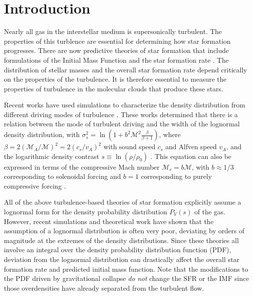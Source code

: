

\ifstandalone

\fi

\section{Introduction}
Nearly all gas in the interstellar medium is supersonically turbulent.  The
properties of this turblence are essential for determining how star formation
progresses.
There are now predictive theories of star formation that include formulations
of the Initial Mass Function \citep[IMF;][]{Padoan2002a, Padoan2007a, Chabrier2010a, 
Elmegreen2011a, Hopkins2012b, Hennebelle2013a} and the star
formation rate
\citep[SFR;][]{Krumholz2005c,  Hennebelle2011a,
Padoan2011b, Krumholz2012b, Federrath2012a, Padoan2012a}.
The distribution of stellar masses and the overall star formation rate depend
critically on the properties of the turbulence.  It is therefore essential to
measure the properties of turbulence in the molecular clouds that produce these
stars.

Recent works have used simulations to characterize the density distribution
from different driving modes of turbulence
\citep{Federrath2008a,Federrath2009a,Federrath2010a,Federrath2011a,Price2011b,Federrath2013a}.
These works determined that there is a relation between the mode of turbulent driving and the width
of the lognormal density distribution, with $\sigma_{s}^2 = \ln\left(1+b^2
\mathcal{M}^2 \frac{\beta}{\beta+1}\right)$, where $\beta=2 (\mathcal{M}_A /
\mathcal{M})^2 = 2 (c_s/v_A)^2$ with sound speed $c_s$ and Alfven speed $v_A$,
and the logarithmic density contrast $s\equiv\ln(\rho/\rho_0)$
\citep{Padoan2011b,Molina2012a}.
This equation can also be expressed in terms of the compressive Mach number
$\mathcal{M}_c = b \mathcal{M}$, with $b\approx 1/3$ corresponding to
solenoidal forcing and $b = 1$ corresponding to purely compressive forcing
\citep{Federrath2010a,Konstandin2012a}.

All of the above turbulence-based theories of star formation explicitly assume a
lognormal form for the density probability distribution $P_V(s)$ of the gas.
However, recent simulations \citep{Federrath2013a} and theoretical work
\citep{Hopkins2013a} have shown that the assumption of a
lognormal distribution is often very poor, deviating by orders of magnitude
at the extremes of the density distributions.  Since these theories all involve
an integral over the density probability distribution function (PDF), deviation from
the lognormal distribution can drastically affect the overall star formation
rate and predicted initial mass function.  Note that the modifications to the
PDF driven by gravitational collapse \emph{do not} change the SFR or the IMF
since those overdensities have already separated from the turbulent flow.

